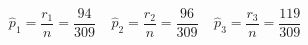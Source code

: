 

\[
\hat{p}_{1} = \frac{r_1}{n} = \frac{94}{309} \;\;\;\; \hat{p}_{2} = \frac{r_2}{n} = \frac{96}{309} \;\;\;\; \hat{p}_{3} = \frac{r_3}{n} = \frac{119}{309}
\]


